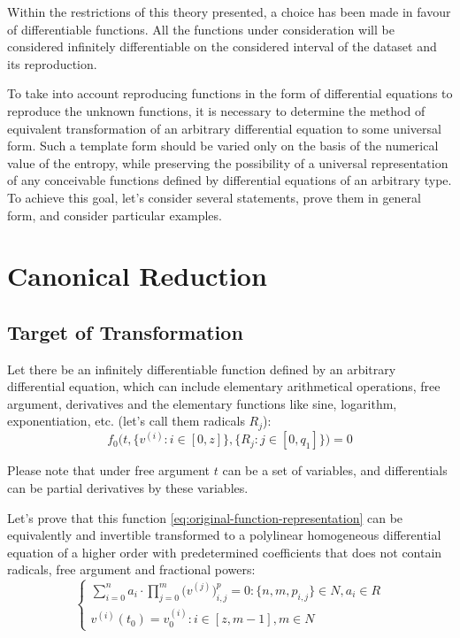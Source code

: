 \documentclass[a4paper, 11pt, oneside]{book}
\begin{document}
Within the restrictions of this theory presented, a choice has been made in favour of differentiable functions. All the functions under consideration will be considered infinitely differentiable on the considered interval of the dataset and its reproduction.

To take into account reproducing functions in the form of differential equations to reproduce the unknown functions, it is necessary to determine the method of equivalent transformation of an arbitrary differential equation to some universal form. Such a template form should be varied only on the basis of the numerical value of the entropy, while preserving the possibility of a universal representation of any conceivable functions defined by differential equations of an arbitrary type. To achieve this goal, let's consider several statements, prove them in general form, and consider particular examples.

\section{Canonical Reduction}
\subsection{Target of Transformation}
Let there be an infinitely differentiable function defined by an arbitrary differential equation, which can include elementary arithmetical operations, free argument, derivatives and the elementary functions like sine, logarithm, exponentiation, etc. (let's call them radicals $R_j$):
\begin{equation}\label{eq:original-function-representation}
  f_0\Big(t, \{v^{(i)}: i \in [0, z]\}, \{R_j: j \in [0, q_1]\}\Big) = 0
\end{equation}

Please note that under free argument $t$ can be a set of variables, and differentials can be partial derivatives by these variables.

Let's prove that this function \ref{eq:original-function-representation} can be equivalently and invertible transformed to a polylinear homogeneous differential equation of a higher order with predetermined coefficients that does not contain radicals, free argument and fractional powers:
\begin{equation}\label{eq:polylinear-target}
  \begin{cases}
    \displaystyle \sum_{i = 0}^n a_i \cdot \prod_{j = 0}^m \Big(v^{(j)}\Big)^p_{i, j} = 0: \{n, m, p_{i, j}\} \in N, a_i \in R \\
    v^{(i)}(t_0) = v_0^{(i)}: i \in [z, m - 1], m \in N
  \end{cases}
\end{equation}
\end{document}
